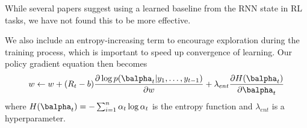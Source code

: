 \documentclass[11pt]{report}
\begin{document}
While several papers suggest using a learned baseline from the RNN state \citep{ranzato2015} in RL tasks, we have not found this to be more effective.

We also include an entropy-increasing term to encourage exploration during the training process, which is important to speed up convergence of learning. Our policy gradient equation then becomes
\begin{equation}
w \gets w + (R_t - b) \frac{\partial \log p(\balpha_t | y_1, \ldots, y_{t-1})}{\partial w}
 + \lambda_{ent} \frac{\partial H(\balpha_t)}{\partial \balpha_t}
\end{equation}
where $H(\balpha_t) = -\sum_{i=1}^n \alpha_t \log \alpha_t$ is the entropy function and $\lambda_{ent}$ is a hyperparameter.


%
%
%

%
%

%
\end{document}
